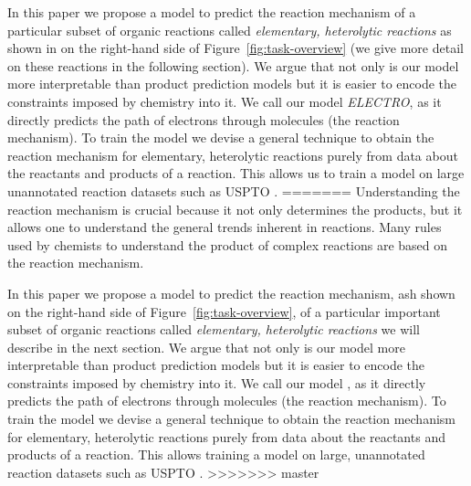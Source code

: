 In this paper we propose a model to predict the reaction mechanism of a particular subset of organic reactions called \emph{elementary, heterolytic reactions} as shown in on the right-hand side of Figure~\ref{fig:task-overview} (we give more detail on these reactions in the following section). 
We argue that not only is our model more interpretable than product prediction models but it is easier to encode the constraints imposed by chemistry into it. 
We call our model \emph{ELECTRO}, as it directly predicts the path of electrons through molecules (the reaction mechanism). 
To train the model we devise a general technique to obtain the reaction mechanism for elementary, heterolytic reactions purely from data about the reactants and products of a reaction. This allows us to train a model on large unannotated reaction datasets such as USPTO \cite{lowe2012extraction}. %
=======
Understanding the reaction mechanism is crucial because it not only determines the products, but it allows one to understand the general trends inherent in reactions.
Many rules used by chemists to understand the product of complex reactions are based on the reaction mechanism.


In this paper we propose a model to predict the reaction mechanism, ash shown on the right-hand side of Figure~\ref{fig:task-overview}, of a particular important subset of organic reactions called \emph{elementary, heterolytic reactions} we will describe in the next section.
We argue that not only is our model more interpretable than product prediction models but it is easier to encode the constraints imposed by chemistry into it. We call our model \ourModel, as it directly predicts the path of electrons through molecules (the reaction mechanism). To train the model we devise a general technique to obtain the reaction mechanism for elementary, heterolytic reactions purely from data about the reactants and products of a reaction. This allows training a model on large, unannotated reaction datasets such as USPTO \cite{lowe2012extraction}. %
>>>>>>> master



